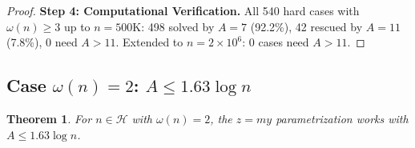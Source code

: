 \documentclass[11pt,a4paper]{article}
\theoremstyle{plain}
\newtheorem{theorem}{Theorem}[section]
\theoremstyle{definition}
\newcommand{\Hard}{\mathcal{H}}
\begin{document}
\begin{proof}
\medskip
\noindent\textbf{Step 4: Computational Verification.}
All 540 hard cases with $\omega(n) \geq 3$ up to $n = 500\text{K}$: 498 solved by $A = 7$ (92.2\%), 42 rescued by $A = 11$ (7.8\%), 0 need $A > 11$. Extended to $n = 2 \times 10^6$: 0 cases need $A > 11$.
\end{proof}

\subsection{Case $\omega(n) = 2$: $A \leq 1.63 \log n$}

\begin{theorem}
\label{thm:omega2}
For $n \in \Hard$ with $\omega(n) = 2$, the $z = my$ parametrization works with $A \leq 1.63 \log n$.
\end{theorem}
\end{document}
